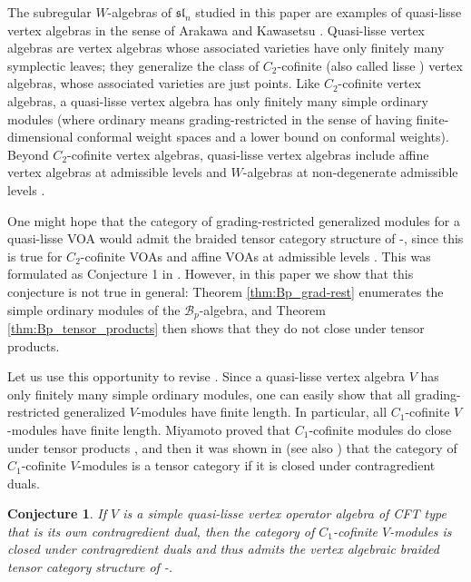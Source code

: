 \documentclass[11pt, reqno]{amsart}
\newtheorem{conj}[thm]{Conjecture}
\theoremstyle{definition}\newtheorem{defi}[thm]{Definition}
\theoremstyle{definition}\newtheorem{rem}[thm]{Remark}
\theoremstyle{definition}\newtheorem{exam}[thm]{Example}
\theoremstyle{definition}\newtheorem{assum}[thm]{Assumption}
\begin{document}
The subregular $W$-algebras of $\mathfrak{sl}_n$ studied in this paper are examples of quasi-lisse vertex algebras in the sense of Arakawa and Kawasetsu \cite{AK}. Quasi-lisse vertex algebras are vertex algebras whose associated varieties have only finitely many symplectic leaves; they generalize the class of $C_2$-cofinite (also called lisse \cite{Ar-assoc-var}) vertex algebras, whose associated varieties are just points. Like $C_2$-cofinite vertex algebras, a quasi-lisse vertex algebra has only finitely many simple ordinary modules (where ordinary means grading-restricted in the sense of having finite-dimensional conformal weight spaces and a lower bound on conformal weights). Beyond $C_2$-cofinite vertex algebras, quasi-lisse vertex algebras include affine vertex algebras at admissible levels and $W$-algebras at non-degenerate admissible levels \cite{AK}.

One might hope that the category of grading-restricted generalized modules for a quasi-lisse VOA would admit the braided tensor category structure of \cite{HLZ1}-\cite{HLZ8}, since this is true for $C_2$-cofinite VOAs \cite{Hu-C2} and affine VOAs at admissible levels \cite{CHY}.  This was formulated as Conjecture 1 in \cite{ACF}. However, in this paper we show that this conjecture is not true in general: Theorem \ref{thm:Bp_grad-rest} enumerates the simple ordinary modules of the $\mathcal B_p$-algebra, and Theorem \ref{thm:Bp_tensor_products} then shows that they do not close under tensor products. 


 
 
Let us use this opportunity to revise \cite[Conjecture 1]{ACF}. Since a quasi-lisse vertex algebra $V$ has only finitely many simple ordinary modules, one can easily show that all grading-restricted generalized $V$-modules have finite length. In particular, all $C_1$-cofinite $V$-modules have finite length. Miyamoto proved that $C_1$-cofinite modules do close under tensor products \cite{Miy}, and then it was shown in \cite{CJORY, CY} (see also \cite[Theorem 2.3]{McR-cosets}) that the category of $C_1$-cofinite $V$-modules is a tensor category if it is closed under contragredient duals.


 
\begin{conj}
If $V$ is a simple quasi-lisse vertex operator algebra of CFT type that is its own contragredient dual, then the category of $C_1$-cofinite $V$-modules is closed under contragredient duals and thus admits the vertex algebraic braided tensor category structure of \cite{HLZ1}-\cite{HLZ8}.
\end{conj}
\end{document}
